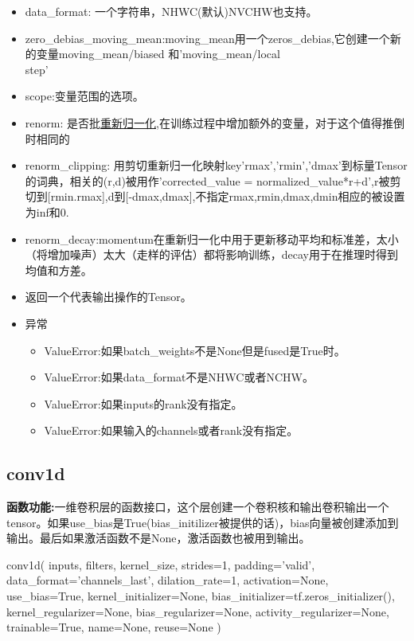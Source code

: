\begin{itemize}
	\item data\_format: 一个字符串，NHWC(默认)NVCHW也支持。
	\item zero\_debias\_moving\_mean:moving\_mean用一个zeros\_debias,它创建一个新的变量moving\_mean/biased
和'moving\_mean/local\\step'
	\item scope:变量范围的选项。
	\item renorm: 是否批\href{https://arxiv.org/pdf/1702.03275.pdf}{重新归一化},在训练过程中增加额外的变量，对于这个值得推倒时相同的
	\item renorm\_clipping: 用剪切重新归一化映射key'rmax','rmin','dmax'到标量Tensor的词典，相关的(r,d)被用作'corrected\_value = normalized\_value*r+d',r被剪切到[rmin.rmax],d到[-dmax,dmax],不指定rmax,rmin,dmax,dmin相应的被设置为inf和0.
	\item renorm\_decay:momentum在重新归一化中用于更新移动平均和标准差，太小（将增加噪声）太大（走样的评估）都将影响训练，decay用于在推理时得到均值和方差。
	\item 返回一个代表输出操作的Tensor。
	\item 异常
	\begin{itemize}
		\item ValueError:如果batch\_weights不是None但是fused是True时。
		\item ValueError:如果data\_format不是NHWC或者NCHW。
		\item ValueError:如果inputs的rank没有指定。
		\item ValueError:如果输入的channels或者rank没有指定。
	\end{itemize}
\end{itemize}
\subsection{conv1d}
\textbf{函数功能:}一维卷积层的函数接口，这个层创建一个卷积核和输出卷积输出一个tensor。如果use\_bias是True(bias\_initilizer被提供的话)，bias向量被创建添加到输出。最后如果激活函数不是None，激活函数也被用到输出。
\begin{python}
conv1d(
    inputs,
    filters,
    kernel_size,
    strides=1,
    padding='valid',
    data_format='channels_last',
    dilation_rate=1,
    activation=None,
    use_bias=True,
    kernel_initializer=None,
    bias_initializer=tf.zeros_initializer(),
    kernel_regularizer=None,
    bias_regularizer=None,
    activity_regularizer=None,
    trainable=True,
    name=None,
    reuse=None
)
\end{python}


